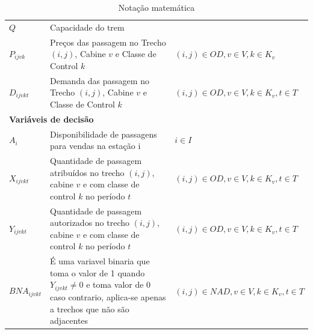 \begin{table}[h]
\begin{tabular}{p{2cm} p{9.5cm} p{3.2cm}}
		$Q$                & Capacidade do trem                                                                                                                                          &                                              \\
		$P_{ijvk}$         & Preços  das passagem no Trecho $(i,j)$, Cabine $v$ e Classe de Control $k$                                                                                  & $(i,j) \in OD,v \in V, k \in K_v$            \\
		$D_{ijvkt}$        & Demanda  das passagem no Trecho $(i,j)$, Cabine $v$ e Classe de Control $k$                                                                                 & $(i,j) \in OD,v \in V, k \in K_v, t \in T$   \\ \midrule
		\multicolumn{3}{l}{\textbf{Variáveis de decisão}}                                                                                                                                                                               \\ \midrule
		$A_{i}$            & Disponibilidade de passagens para vendas na estação i                                                                                                       & $i \in I$                                    \\
		$X_{ijvkt}$        & Quantidade de passagem atribuídos no trecho $(i,j)$, cabine $v$ e com classe de control $k$ no período $t$                                                  & $(i,j) \in OD, v \in V, k \in K_v, t \in T$  \\
		$Y_{ijvkt}$        & Quantidade de passagem autorizados no trecho $(i,j)$, cabine $v$ e com classe de control $k$ no período $t$                                                 & $(i,j) \in OD, v \in V, k \in K_v, t \in T$  \\
		$BNA_{ijvkt}$      & É uma variavel binaria que toma o valor de 1 quando $Y_{ijvkt} \neq 0$ e toma  valor de 0 caso contrario, aplica-se apenas a trechos que não são adjacentes & $(i,j) \in NAD, v \in V, k \in K_v, t \in T$ \\
		\bottomrule
	\end{tabular}
	\caption{Notação matemática}
	\label{tab: m1_definicao}
\end{table}


